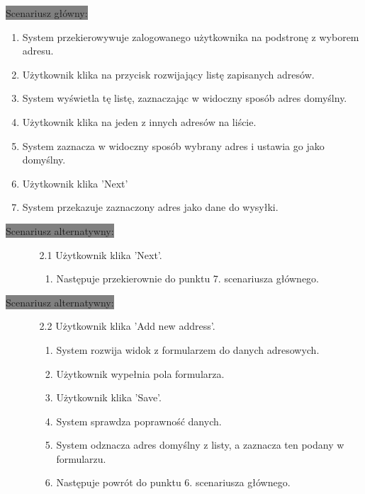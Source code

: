 \documentclass[12pt]{report}
\begin{document}
	\colorbox{grey}{Scenariusz główny:}
	\begin{enumerate}
		\item System przekierowywuje zalogowanego użytkownika na podstronę z wyborem adresu.
		\item Użytkownik klika na przycisk rozwijający listę zapisanych adresów.
		\item System wyświetla tę listę, zaznaczając w widoczny sposób adres domyślny.
		\item Użytkownik klika na jeden z innych adresów na liście.
		\item System zaznacza w widoczny sposób wybrany adres i ustawia go jako domyślny.
		\item Użytkownik klika 'Next'
		\item System przekazuje zaznaczony adres jako dane do wysyłki.
	\end{enumerate}
	\newpage
	\colorbox{grey}{Scenariusz alternatywny:}
	\begin{enumerate}\addtocounter{enumi}{2}
		\item[]
		\begin{enumerate}
			\item[2.1] Użytkownik klika 'Next'.
			\begin{enumerate}
				\item Następuje przekierownie do punktu 7. scenariusza głównego.
			\end{enumerate}
		\end{enumerate}
	\end{enumerate}

	\colorbox{grey}{Scenariusz alternatywny:}
	\begin{enumerate}\addtocounter{enumi}{2}
		\item[]
		\begin{enumerate}
			\item[2.2] Użytkownik klika 'Add new address'.
				\begin{enumerate}
					\item System rozwija widok z formularzem do danych adresowych.
					\item Użytkownik wypełnia pola formularza.
					\item Użytkownik klika 'Save'.
					\item System sprawdza poprawność danych.
					\item System odznacza adres domyślny z listy, a zaznacza ten podany w formularzu.
					\item Następuje powrót do punktu 6. scenariusza głównego.	
				\end{enumerate}
		\end{enumerate}
	\end{enumerate}
	
\end{document}
